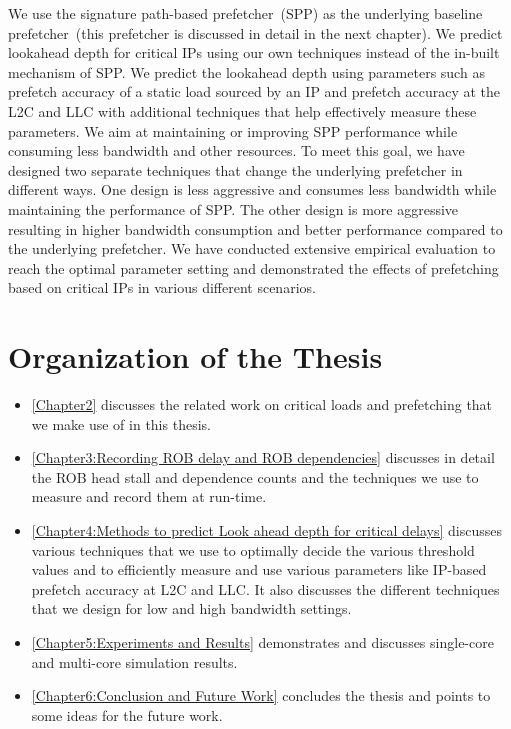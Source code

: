 We use the signature path-based prefetcher~(SPP) as the underlying baseline prefetcher~(this prefetcher is discussed in detail in the next chapter). We predict lookahead depth for critical IPs using our own techniques instead of the in-built mechanism of SPP.
We predict the lookahead depth using parameters such as prefetch accuracy of a static load sourced by an IP and prefetch accuracy at the L2C and LLC with additional techniques that help effectively measure these parameters. We aim at maintaining or improving SPP performance while consuming less bandwidth and other resources.
To meet this goal, we have designed two separate techniques that change the underlying prefetcher in different ways. One design is less aggressive and consumes less bandwidth while maintaining the performance of SPP. The other design is more aggressive resulting in higher bandwidth consumption and better performance compared to the underlying prefetcher.
We have conducted extensive empirical evaluation to reach the optimal parameter setting and demonstrated the effects of prefetching based on critical IPs in various different scenarios.

\section{Organization of the Thesis}
\begin{itemize}
    \item \autoref{Chapter2} discusses the related work on critical loads and prefetching that we make use of in this thesis.
    \item \autoref{Chapter3:Recording ROB delay and ROB dependencies} discusses in detail the ROB head stall and dependence counts and the techniques we use to measure and record them at run-time.
    \item \autoref{Chapter4:Methods to predict Look ahead depth for critical delays}  discusses various techniques that we use to optimally decide the various threshold values and to efficiently measure and use various parameters like IP-based prefetch accuracy at L2C and LLC. It also discusses the different techniques that we design for low and high bandwidth settings.
    
    \item \autoref{Chapter5:Experiments and Results} demonstrates and discusses single-core and multi-core simulation results. 
    
    \item  \autoref{Chapter6:Conclusion and Future Work} concludes the thesis and points to some ideas for the future work.
\end{itemize}







